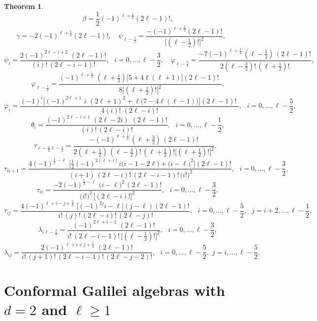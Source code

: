 \documentclass[12pt]{article}
\newtheorem{thm}{Theorem}
\begin{document}
\begin{thm}
$$\beta =\frac{1}{2}  (-1)^{\ell+\frac{1}{2}} (2\ell-1)!   , 
$$
$$
\gamma =
-2 (-1)^{\ell+\frac{1}{2}} (2\ell-1)!  , 
 \quad 
  \psi_{\ell-\frac{1}{2}} =\frac{ -(-1)^{\ell+\frac{3}{2}} (2\ell-1)! }{\Big [(\ell-\frac{1}{2})!\Big]^2}  ,\qquad
$$
$$
  \psi_{i} =
  \frac{  2(-1)^{2\ell-i+2}\,\,(2\ell-1)! }{(i)!\,(2\ell-i-1)!} ,\,\,\,\,  i=
	0,\ldots, \ell-\frac{3}{2},\quad
 \varphi_{\ell-\frac{3}{2}}=
  \frac{  -7(-1)^{\ell+\frac{1}{2}}\,(\ell-\frac{1}{2})\,(2\ell-1)! }{2(\ell-\frac{3}{2})!\,(\ell+\frac{1}{2})!} , 
$$
$$
     \varphi_{\ell-\frac{1}{2}}=
    \frac{  (-1)^{\ell+\frac{1}{2}}\,\,(\ell+\frac{1}{2})\Big[ 5+4\ell(\ell+1)  \Big]  (2\ell-1)!\,\,   }{ 8\Big [(\ell+\frac{1}{2})!\Big]^2},
$$
$$
       \varphi_{i}= \frac{ (-1)^{i} \Big[ (-1)^{2\ell+1}\,\,i\,\,
	(2\ell+1)^2+\ell \Big(7-4\ell(\ell-1)\Big)  \Big]  (2\ell-1)!\,\,   }{
		4(i)!\,\, (2\ell-i)!},\,\,\,\,  i= 0,\ldots, \ell-\frac{5}{2}, 
$$
$$
  \theta_{i}=\frac{  (-1)^{2\ell-i+1}\,\,(2\ell-2i)\,\,(2\ell-1)!
	}{(i)!\,(2\ell-i)!} ,\,\,\,\,  i= 0,\ldots, \ell-\frac{1}{2}, 
$$
$$
  \tau_{\ell-\frac{1}{2}\ell-\frac{1}{2}} = \frac{  -(-1)^{\ell+\frac{1}{2}}\,(\ell+\frac{3}{2})\,(2\ell-1)! }{2(\ell+\frac{1}{2})\,(\ell-\frac{3}{2})!\,(\ell+\frac{1}{2})!\Big [(\ell+\frac{1}{2})!\Big]^2},\,\,\,\, 
$$
$$
  \tau_{ii+1}= \frac{  4(-1)^{\frac{1}{2}-\ell}\,\, \Big[
	  \frac{1}{2}(-1)^{2(\ell+i)}i \big(i-1-2\ell\big)+\big(i-\ell \big)^2
	  \Big] (2\ell-1)! }{\,(i+1) \, (2\ell-i)!\, (2\ell-i-1)!\,
	  \big(i!\big)^2},\,\,\,\,  i= 0,\ldots, \ell-\frac{3}{2},
$$
$$
  \tau_{ii}=  \frac{  -2(-1)^{\frac{1}{2}-\ell}\,\, \big(i-\ell \big)^2 \,
	(2\ell-1)! }{\big(i!\big)^2 \,  \big[(2\ell-i)!\big]^2},\,\,\,\,  i=
	0,\ldots, \ell-\frac{3}{2}, 
$$
$$
     \tau_{ij}=  \frac{  4(-1)^{\ell+i-j+\frac{5}{2}}\,\, \Big[ (-1)^{2j}i-\ell
     \Big] (j-\ell)(2\ell-1)! }{\,i! \,(j)!\, (2\ell-i)!\, (2\ell-j)!},\,\,\,\,
     i= 0,\ldots, \ell-\frac{5}{2},\,\,\,\, j=i+2,\ldots, \ell-\frac{1}{2},
$$
$$
      \lambda_{i\ell-\frac{3}{2} }= 
  \frac{  (-1)^{2\ell+i-1}\,\,(2\ell-1)!}{i!\,(2\ell-i-1)!\,\Big
  [(\ell-\frac{1}{2})!\Big]^2 },\,\,\,\,  i= 0,\ldots, \ell-\frac{3}{2},
$$
$$
  \lambda_{ij}= 
  \frac{  2(-1)^{\ell+i+j+\frac{1}{2}}\,\,(2\ell-1)!
  }{i!\,(j+1)!\,(2\ell-i-1)!\,(2\ell-j-2)!},\,\,\,\,  i= 0,\ldots,
  \ell-\frac{5}{2},\,\, j= i,\ldots, \ell-\frac{5}{2}.
$$
\end{thm}

\section{Conformal Galilei algebras with $d=2$ and $\ell\geq 1$}
\end{document}
